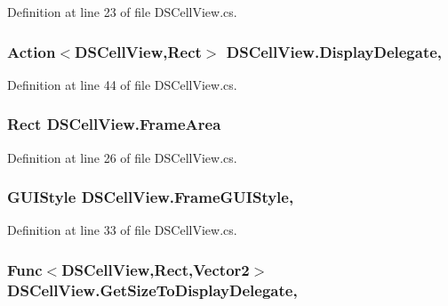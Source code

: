 Definition at line 23 of file D\+S\+Cell\+View.\+cs.

\hypertarget{class_d_s_cell_view_aa147a836602429e730831128b84eb74b}{
\subsubsection[{Display\+Delegate}]{\setlength{\rightskip}{0pt plus 5cm}Action$<${\bf D\+S\+Cell\+View},Rect$>$ D\+S\+Cell\+View.\+Display\+Delegate\hspace{0.3cm}{\ttfamily [get]}, {\ttfamily [set]}}}\label{class_d_s_cell_view_aa147a836602429e730831128b84eb74b}


Definition at line 44 of file D\+S\+Cell\+View.\+cs.

\hypertarget{class_d_s_cell_view_a8c4d002aee92cc360a4efedc99ae4457}{
\subsubsection[{Frame\+Area}]{\setlength{\rightskip}{0pt plus 5cm}Rect D\+S\+Cell\+View.\+Frame\+Area\hspace{0.3cm}{\ttfamily [get]}}}\label{class_d_s_cell_view_a8c4d002aee92cc360a4efedc99ae4457}


Definition at line 26 of file D\+S\+Cell\+View.\+cs.

\hypertarget{class_d_s_cell_view_a8197fbd9d2a2107fc9419fba961dc6c1}{
\subsubsection[{Frame\+G\+U\+I\+Style}]{\setlength{\rightskip}{0pt plus 5cm}G\+U\+I\+Style D\+S\+Cell\+View.\+Frame\+G\+U\+I\+Style\hspace{0.3cm}{\ttfamily [get]}, {\ttfamily [set]}}}\label{class_d_s_cell_view_a8197fbd9d2a2107fc9419fba961dc6c1}


Definition at line 33 of file D\+S\+Cell\+View.\+cs.

\hypertarget{class_d_s_cell_view_a430333bb1eb853cad8ca9ebbba63804d}{
\subsubsection[{Get\+Size\+To\+Display\+Delegate}]{\setlength{\rightskip}{0pt plus 5cm}Func$<${\bf D\+S\+Cell\+View},Rect,Vector2$>$ D\+S\+Cell\+View.\+Get\+Size\+To\+Display\+Delegate\hspace{0.3cm}{\ttfamily [get]}, {\ttfamily [set]}}}\label{class_d_s_cell_view_a430333bb1eb853cad8ca9ebbba63804d}


